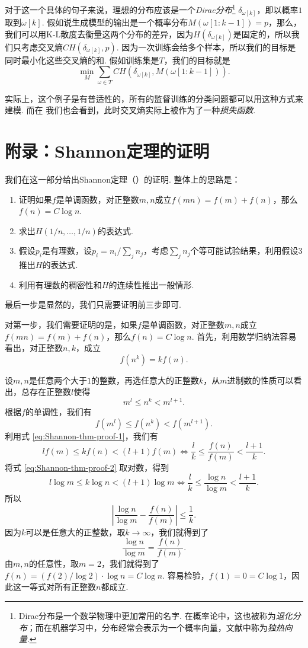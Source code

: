 对于这一个具体的句子来说，理想的分布应该是一个\emph{Dirac分布}\footnote{Dirac分布是一个数学物理中更加常用的名字. 在概率论中，这也被称为\emph{退化分布}；而在机器学习中，分布经常会表示为一个概率向量，文献中称为\emph{独热向量}. } $\delta_{\omega[k]}$，即以概率$1$取到$\omega[k]$. 假如说生成模型的输出是一个概率分布$M(\omega[1:k-1])=p$，那么，我们可以用K-L散度去衡量这两个分布的差异，因为$H(\delta_{\omega[k]})$是固定的，所以我们只考虑交叉熵$CH(\delta_{\omega[k]},p)$. 因为一次训练会给多个样本，所以我们的目标是同时最小化这些交叉熵的和. 假如训练集是$T$，我们的目标就是
\[
    \min_{M} \sum_{\omega\in T} CH(\delta_{\omega[k]},M(\omega[1:k-1])).
\]

实际上，这个例子是有普适性的，所有的监督训练的分类问题都可以用这种方式来建模. 而在  我们也会看到，此时交叉熵实际上被作为了一种\emph{损失函数}.

\section{附录：Shannon定理的证明}\label{sec:Shannon-thm-proofs}
我们在这一部分给出Shannon定理（）的证明. 整体上的思路是：
\begin{enumerate}
    \item 证明如果$f$是单调函数，对正整数$m,n$成立$f(mn)=f(m)+f(n)$，那么$f(n)=C\log n$.
    \item 求出$H(1/n,\dots,1/n)$的表达式.
    \item 假设$p_i$是有理数，设$p_i=n_i/\sum_j n_j$，考虑$\sum_j n_j$个等可能试验结果，利用假设3推出$H$的表达式.
    \item 利用有理数的稠密性和$H$的连续性推出一般情形.
\end{enumerate}
最后一步是显然的，我们只需要证明前三步即可.

对第一步，我们需要证明的是，如果$f$是单调函数，对正整数$m,n$成立$f(mn)=f(m)+f(n)$，那么$f(n)=C\log n$. 首先，利用数学归纳法容易看出，对正整数$n,k$，成立
\begin{equation}
    f(n^k)=kf(n).\label{eq:Shannon-thm-proof-1}
\end{equation}

设$m,n$是任意两个大于$1$的整数，再选任意大的正整数$k$，从$m$进制数的性质可以看出，总存在正整数$l$使得
\begin{equation}
    m^l\leq n^k < m^{l+1}.\label{eq:Shannon-thm-proof-2}
\end{equation}
根据$f$的单调性，我们有
\[
    f(m^l)\leq f(n^k) < f(m^{l+1}).
\]
利用式 \eqref{eq:Shannon-thm-proof-1}，我们有
\[
    lf(m)\leq kf(n) < (l+1)f(m)\iff \frac{l}{k}\leq \frac{f(n)}{f(m)} < \frac{l+1}{k}.
\]
将式 \eqref{eq:Shannon-thm-proof-2} 取对数，得到
\[
    l\log m\leq k\log n < (l+1)\log m\iff \frac{l}{k}\leq \frac{\log n}{\log m} < \frac{l+1}{k}.
\]
所以
\[
    \left|\frac{\log n}{\log m}-\frac{f(n)}{f(m)}\right|\leq\frac1k.
\]
因为$k$可以是任意大的正整数，取$k\to\infty$，我们就得到了
\[
    \frac{\log n}{\log m}=\frac{f(n)}{f(m)}.
\]
由$m,n$的任意性，取$m=2$，我们就得到了$f(n)=(f(2)/\log 2)\cdot \log n= C\log n$. 容易检验，$f(1)=0=C\log 1$，因此这一等式对所有正整数$n$都成立.

